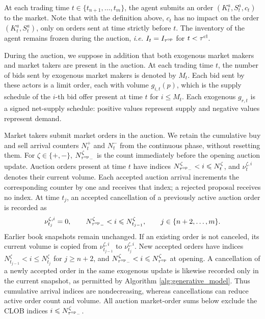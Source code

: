 \documentclass[11pt]{article}
\begin{document}
At each trading time $t\in \{t_{n+1},\dots, t_m\}$, the agent submits an order $(K_t^a, S_t^a, c_t)$ to the market. Note that with the definition above, $c_t$ has no impact on the order $(K_t^a,S_t^a)$, only on orders sent at time strictly before $t$. The inventory of the agent remains frozen during the auction, \textit{i.e.} $I_t = I_{ \tau^{\mathrm{op}}}$ for $t< \tau^{\mathrm{cl}}$.\vspace{0.5em}

During the auction, we suppose in addition that both exogenous market makers and market takers are present in the auction. At each trading time $t$, the number of bids sent by exogenous market makers is denoted by $M_t$. Each bid sent by these actors is a limit order, each with volume $g_{i,t}(p)$, which is the supply schedule of the $i$-th bid offer present at time $t$ for $i \leqslant M_t$. Each exogenous $g_{r,t}$ is a signed net-supply schedule: positive values represent supply and negative values represent demand. \vspace{0.5em}

Market takers submit market orders in the auction. We retain the cumulative buy and sell arrival counters $N_t^+$ and $N_t^-$ from the continuous phase, without resetting them. For $\zeta\in\{+,-\}$, $N_{{\tau^{\mathrm{op}}}_-}^\zeta$ is the count immediately before the opening auction update. Auction orders present at time $t$ have indices $N_{{\tau^{\mathrm{op}}}_-}^\zeta<i\leqslant N_t^\zeta$, and $\nu_t^{\zeta,i}$ denotes their current volume. Each accepted auction arrival increments the corresponding counter by one and receives that index; a rejected proposal receives no index. At time $t_j$, an accepted cancellation of a previously active auction order is recorded as
\[
\nu_{t_j}^{\zeta,i}=0,\qquad
N_{{\tau^{\mathrm{op}}}_-}^\zeta<i\leqslant N_{t_{j-1}}^\zeta,
\qquad j\in\{n+2,\ldots,m\}.
\]
Earlier book snapshots remain unchanged. If an existing order is not canceled, its current volume is copied from $\nu_{t_{j-1}}^{\zeta,i}$ to $\nu_{t_j}^{\zeta,i}$. New accepted orders have indices $N_{t_{j-1}}^\zeta<i\leqslant N_{t_j}^\zeta$ for $j\geqslant n+2$, and $N_{{\tau^{\mathrm{op}}}_-}^\zeta<i\leqslant N_{\tau^{\mathrm{op}}}^\zeta$ at opening. A cancellation of a newly accepted order in the same exogenous update is likewise recorded only in the current snapshot, as permitted by Algorithm \ref{alg:generative_model}. Thus cumulative arrival indices are nondecreasing, whereas cancellations can reduce active order count and volume. All auction market-order sums below exclude the CLOB indices $i\leqslant N_{{\tau^{\mathrm{op}}}_-}^\zeta$.
\end{document}
